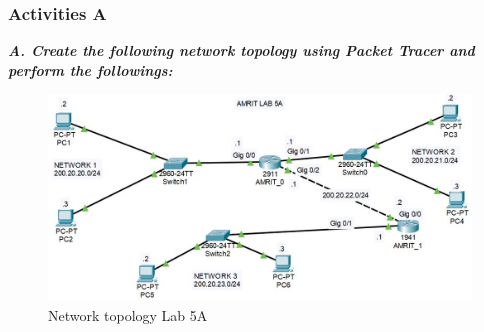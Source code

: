 \documentclass[a4paper,11pt]{article}
\begin{document}
%
%
%


%
%
%
\subsubsection{Activities A}

{\bfseries \textit{A. Create the following network topology using Packet Tracer and perform the followings:}}
\begin{figure}[H]
    \centering
    \includegraphics[scale=0.8,cframe=blue 0.5pt 3pt]{Lab5A.jpg}
    \caption{Network topology Lab 5A}
\end{figure}
\end{document}
